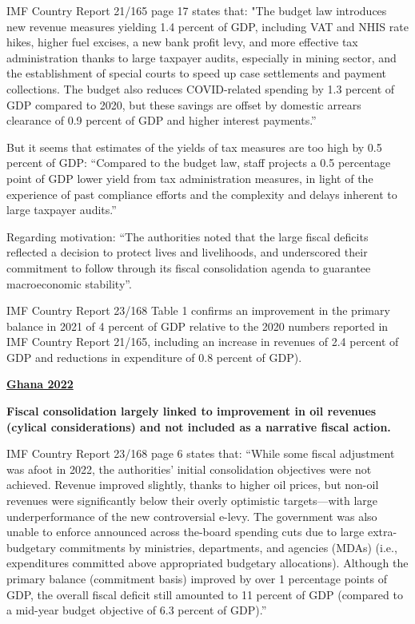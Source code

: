 IMF Country Report 21/165 page 17 states that: "The budget law introduces new revenue measures yielding 1.4 percent of GDP, including VAT and NHIS rate hikes, higher fuel excises, a new bank profit levy, and more effective tax administration thanks to large taxpayer audits, especially in mining sector, and the establishment of special courts to speed up case settlements and payment collections. The budget also reduces COVID-related spending by 1.3 percent of GDP compared to 2020, but these savings are offset by domestic arrears clearance of 0.9 percent of GDP and higher interest payments.”

But it seems that estimates of the yields of tax measures are too high by 0.5 percent of GDP: “Compared to the budget law, staff projects a 0.5 percentage point of GDP lower yield from tax administration measures, in light of the experience of past compliance efforts and the complexity and delays inherent to large taxpayer audits.”

Regarding motivation: “The authorities noted that the large fiscal deficits reflected a decision to protect lives and livelihoods, and underscored their commitment to follow through its fiscal consolidation agenda to guarantee macroeconomic stability”.

IMF Country Report 23/168 Table 1 confirms an improvement in the primary balance in 2021 of 4 percent of GDP relative to the 2020 numbers reported in IMF Country Report 21/165, including an increase in revenues of 2.4 percent of GDP and reductions in expenditure of 0.8 percent of GDP). 

\textbf{\underline{Ghana 2022}}

\textbf{Fiscal consolidation largely linked to improvement in oil revenues (cylical considerations) and not included as a narrative fiscal action.} 

IMF Country Report 23/168 page 6 states that: “While some fiscal adjustment was afoot in 2022, the authorities’ initial consolidation objectives were not achieved. Revenue improved slightly, thanks to higher oil prices, but non-oil revenues were significantly below their overly optimistic targets—with large underperformance of the new controversial e-levy. The government was also unable to enforce announced across the-board spending cuts due to large extra-budgetary commitments by ministries, departments, and agencies (MDAs) (i.e., expenditures committed above appropriated budgetary allocations). Although the primary balance (commitment basis) improved by over 1 percentage points of GDP, the overall fiscal deficit still amounted to 11 percent of GDP (compared to a mid-year budget objective of 6.3 percent of GDP).”

